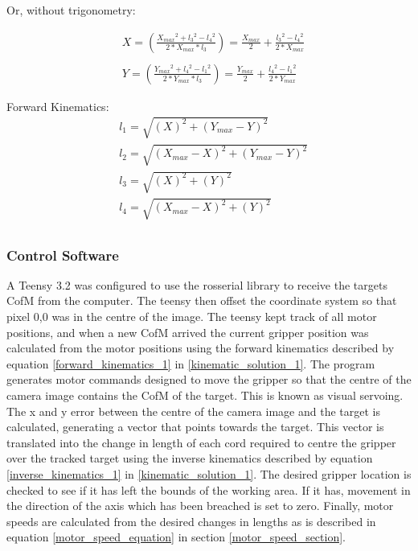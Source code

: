 \documentclass[conference]{IEEEtran}
\begin{document}
Or, without trigonometry:

\begin{equation} \label{inverse_kinematics_1}
\begin{aligned}
&X = \left(\frac{X_{max}{}^2 + l_3{}^2 - l_4{}^2}{2*X_{max}*l_3}\right) = \frac{X_{max}}{2} + \frac{l_3{}^2 - l_4{}^2}{2*X_{max}}\\ \\
&Y = \left(\frac{Y_{max}{}^2 + l_4{}^2 - l_1{}^2}{2*Y_{max}*l_3}\right) = \frac{Y_{max}}{2} + \frac{l_4{}^2 - l_1{}^2}{2*Y_{max}}
\end{aligned}
\end{equation}

Forward Kinematics:
\begin{equation} \label{forward_kinematics_1}
\begin{aligned}
&l_1 = \sqrt{\left(X\right)^2 + \left(Y_{max}-Y\right)^2}\\
&l_2 = \sqrt{\left(X_{max}-X\right)^2 + \left(Y_{max}-Y\right)^2}\\
&l_3 = \sqrt{\left(X\right)^2 + \left(Y\right)^2}\\
&l_4 = \sqrt{\left(X_{max}-X\right)^2 + \left(Y\right)^2}\\
\end{aligned}
\end{equation}

\subsubsection{Control Software}
A Teensy 3.2 was configured to use the rosserial library to receive the targets CofM from the computer. The teensy then offset the coordinate system so that pixel 0,0 was in the centre of the image. The teensy kept track of all motor positions, and when a new CofM arrived the current gripper position was calculated from the motor positions using the forward kinematics described by equation \ref{forward_kinematics_1} in \ref{kinematic_solution_1}. The program generates motor commands designed to move the gripper so that the centre of the camera image contains the CofM of the target. This is known as visual servoing. The x and y error between the centre of the camera image and the target is calculated, generating a vector that points towards the target. This vector is translated into the change in length of each cord required to centre the gripper over the tracked target using the inverse kinematics described by equation \ref{inverse_kinematics_1} in \ref{kinematic_solution_1}. The desired gripper location is checked to see if it has left the bounds of the working area. If it has, movement in the direction of the axis which has been breached is set to zero. Finally, motor speeds are calculated from the desired changes in lengths as is described in equation \ref{motor_speed_equation} in section \ref{motor_speed_section}.
\end{document}
